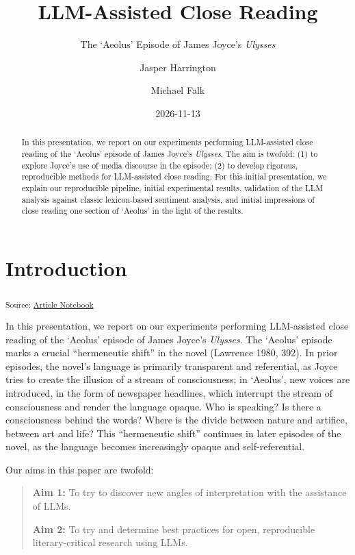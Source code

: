 \documentclass[
  letterpaper,
  DIV=11,
  numbers=noendperiod]{scrartcl}
\title{LLM-Assisted Close Reading}
\subtitle{The `Aeolus' Episode of James Joyce's \emph{Ulysses}}
\author{Jasper Harrington \and Michael Falk}
\date{2026-11-13}
\begin{document}
\maketitle
\begin{abstract}
In this presentation, we report on our experiments performing
LLM-assisted close reading of the `Aeolus' episode of James Joyce's
\emph{Ulysses}. The aim is twofold: (1) to explore Joyce's use of media
discourse in the episode; (2) to develop rigorous, reproducible methods
for LLM-assisted close reading. For this initial presentation, we
explain our reproducible pipeline, initial experimental results,
validation of the LLM analysis against classic lexicon-based sentiment
analysis, and initial impressions of close reading one section of
`Aeolus' in the light of the results.
\end{abstract}


\section{Introduction}\label{introduction}

\textsubscript{Source:
\href{https://uom-digital-studies.github.io/aeolus-microtexts/index.qmd.html}{Article
Notebook}}

In this presentation, we report on our experiments performing
LLM-assisted close reading of the `Aeolus' episode of James Joyce's
\emph{Ulysses}. The `Aeolus' episode marks a crucial ``hermeneutic
shift'' in the novel (Lawrence 1980, 392). In prior episodes, the
novel's language is primarily transparent and referential, as Joyce
tries to create the illusion of a stream of consciousness; in `Aeolus',
new voices are introduced, in the form of newspaper headlines, which
interrupt the stream of consciousness and render the language opaque.
Who is speaking? Is there a consciousness behind the words? Where is the
divide between nature and artifice, between art and life? This
``hermeneutic shift'' continues in later episodes of the novel, as the
language becomes increasingly opaque and self-referential.

Our aims in this paper are twofold:

\begin{quote}
\textbf{Aim 1:} To try to discover new angles of interpretation with the
assistance of LLMs.

\textbf{Aim 2:} To try and determine best practices for open,
reproducible literary-critical research using LLMs.
\end{quote}
\end{document}
